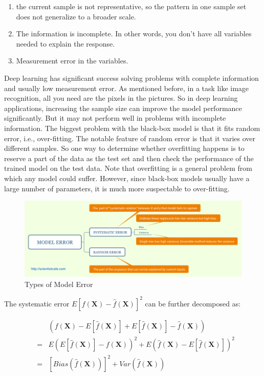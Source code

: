 \documentclass[
  12pt,
]{krantz}
\providecommand{\tightlist}{%
  \setlength{\itemsep}{0pt}\setlength{\parskip}{0pt}}
\begin{document}
\begin{enumerate}
\def\labelenumi{\arabic{enumi}.}
\tightlist
\item
  the current sample is not representative, so the pattern in one sample set does not generalize to a broader scale.
\item
  The information is incomplete. In other words, you don't have all variables needed to explain the response.
\item
  Measurement error in the variables.
\end{enumerate}

Deep learning has significant success solving problems with complete information and usually low measurement error. As mentioned before, in a task like image recognition, all you need are the pixels in the pictures. So in deep learning applications, increasing the sample size can improve the model performance significantly. But it may not perform well in problems with incomplete information. The biggest problem with the black-box model is that it fits random error, i.e., over-fitting. The notable feature of random error is that it varies over different samples. So one way to determine whether overfitting happens is to reserve a part of the data as the test set and then check the performance of the trained model on the test data. Note that overfitting is a general problem from which any model could suffer. However, since black-box models usually have a large number of parameters, it is much more suspectable to over-fitting.

\begin{figure}
\centering
\includegraphics{images/ModelError.png}
\caption{Types of Model Error}
\end{figure}

The systematic error \(E[f(\mathbf{X})-\hat{f}(\mathbf{X})]^{2}\) can be further decomposed as:

\begin{equation}
\begin{array}{ccc}
 &  & \left(f(\mathbf{X})-E[\hat{f}(\mathbf{X})]+E[\hat{f}(\mathbf{X})]-\hat{f}(\mathbf{X})\right)\\
 & = & E\left(E[\hat{f}(\mathbf{X})]-f(\mathbf{X})\right)^{2}+E\left(\hat{f}(\mathbf{X})-E[\hat{f}(\mathbf{X})]\right)^{2}\\
 & = & [Bias(\hat{f}(\mathbf{X}))]^{2}+Var(\hat{f}(\mathbf{X}))
\end{array}
\label{eq:biasvariance}
\end{equation}
\end{document}
